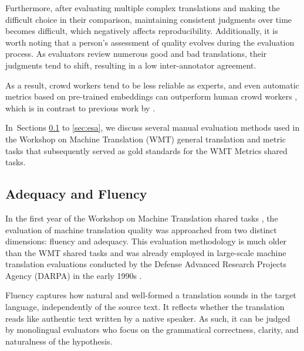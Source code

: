 Furthermore, after evaluating multiple complex translations and making the difficult choice in their comparison, maintaining consistent judgments over time becomes difficult, which negatively affects reproducibility. Additionally, it is worth noting that a person's assessment of quality evolves during the evaluation process. As evaluators review numerous good and bad translations, their judgments tend to shift, resulting in a low inter-annotator agreement.  

As a result, crowd workers tend to be less reliable \citep{graham_2017} as experts, and even automatic metrics based on pre-trained embeddings can outperform human crowd workers  \citep{freitag-etal-2021-experts}, which is in contrast to previous work by \cite{bentivogli-etal-2011-getting}. 

In~Sections \ref{adequacy} to \ref{sec:esa}, we discuss several manual evaluation methods used in the Workshop on Machine Translation (WMT) general translation and metric tasks that subsequently served as gold standards for the WMT Metrics shared tasks.


\subsection{Adequacy and Fluency}
\label{adequacy}

In the first year of the Workshop on Machine Translation shared tasks \citep{koehn-monz:2006:WMT}, the evaluation of machine translation quality was approached from two distinct dimensions: fluency and adequacy. This evaluation methodology is much older than the WMT shared tasks and was already employed in large-scale machine translation evaluations conducted by the Defense Advanced Research Projects Agency (DARPA) in the early 1990s \citep{white-etal-1994-arpa}. 

Fluency captures how natural and well-formed a translation sounds in the target language, independently of the source text. It reflects whether the translation reads like authentic text written by a native speaker. As such, it can be judged by monolingual evaluators who focus on the grammatical correctness, clarity, and naturalness of the hypothesis.

